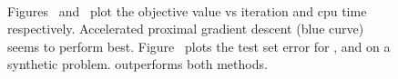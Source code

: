 \begin{figure}
{  \vspace{\imlabelspace}
  \label{fig:time}
}
 \\
\caption[]{ \hspace{-0.1in}
Figures~ and~ plot the objective value vs
iteration and cpu time respectively. Accelerated proximal gradient descent (blue
curve) seems to perform best. Figure~ plots the test set
error for \addkrrs, \krrs and \nws on a synthetic problem. 
\addkrrs outperforms both methods.
}
\label{fig:toythree}
\vspace{\imtextspace}
\end{figure}

